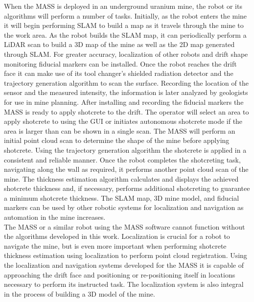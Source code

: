 When the MASS is deployed in an underground uranium mine, the robot or its algorithms will perform a number of tasks. Initially, as the robot enters the mine it will begin performing SLAM to build a map as it travels through the mine to the work area. As the robot builds the SLAM map, it can periodically perform a LiDAR scan to build a 3D map of the mine as well as the 2D map generated through SLAM. For greater accuracy, localization of other robots and drift shape monitoring fiducial markers can be installed. Once the robot reaches the drift face it can make use of its tool changer's shielded radiation detector and the trajectory generation algorithm to scan the surface. Recording the location of the sensor and the measured intensity, the information is later analyzed by geologists for use in mine planning. After installing and recording the fiducial markers the MASS is ready to apply shotcrete to the drift. The operator will select an area to apply shotcrete to using the GUI or initiates autonomous shotcrete mode if the area is larger than can be shown in a single scan. The MASS will perform an initial point cloud scan to determine the shape of the mine before applying shotcrete. Using the trajectory generation algorithm the shotcrete is applied in a consistent and reliable manner. Once the robot completes the shotcreting task, navigating along the wall as required, it performs another point cloud scan of the mine. The thickness estimation algorithm calculates and displays the achieved shotcrete thickness and, if necessary, performs additional shotcreting to guarantee a minimum shotcrete thickness. The SLAM map, 3D mine model, and fiducial markers can be used by other robotic systems for localization and navigation as automation in the mine increases.\\

The MASS or a similar robot using the MASS software cannot function without the algorithms developed in this work. Localization is crucial for a robot to navigate the mine, but is even more important when performing shotcrete thickness estimation using localization to perform point cloud registration. Using the localization and navigation systems developed for the MASS it is capable of approaching the drift face and positioning or re-positioning itself in locations necessary to perform its instructed task. The localization system is also integral in the process of building a 3D model of the mine.\\

